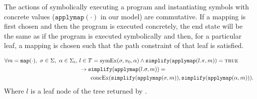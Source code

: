 \begin{property}[Commutativity]
  \label{prop:kingcommutativity}
  The actions of symbolically executing a program and instantiating symbols with
  concrete values ($\mathtt{applymap(\cdot)}$ in our model) are commutative. If a
  mapping is first chosen and then the program is executed concretely, the end
  state will be the same as if the program is executed symbolically and then,
  for a particular leaf, a mapping is chosen such that the path constraint of
  that leaf is satisfied.





\begin{align*}
\forall m = \mathtt{map(\cdot)},~\sigma \in \Sigma,~\alpha \in \Sigma_i,~& l \in T = \mathrm{symEx}(\sigma,\pi_0,\alpha) \wedge
\mathtt{simplify}(\mathtt{applymap}(l.\pi,m)) = \mathtt{\textsc{true}} \\
&\rightarrow \mathtt{simplify}(\mathtt{applymap}(l.\sigma,m)) = \\
&\qquad\mathrm{concEx}(\mathtt{simplify}(\mathtt{applymap}(\sigma,m)),\mathtt{simplify}(\mathtt{applymap}(\alpha,m))).
\end{align*}
Where $l$ is a leaf node of the tree returned by \symexecution.


\end{property}



